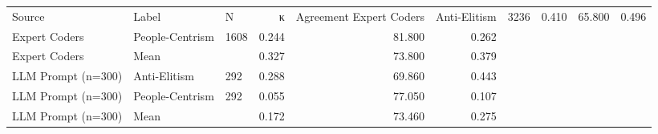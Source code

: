 \begin{tabular}{lllrrr}
\toprule
Source & Label & N & κ & Agreement %
\midrule
Expert Coders & Anti-Elitism & 3236 & 0.410 & 65.800 & 0.496 \\
Expert Coders & People-Centrism & 1608 & 0.244 & 81.800 & 0.262 \\
Expert Coders & Mean &  & 0.327 & 73.800 & 0.379 \\
LLM Prompt (n=300) & Anti-Elitism & 292 & 0.288 & 69.860 & 0.443 \\
LLM Prompt (n=300) & People-Centrism & 292 & 0.055 & 77.050 & 0.107 \\
LLM Prompt (n=300) & Mean &  & 0.172 & 73.460 & 0.275 \\
\bottomrule
\end{tabular}
